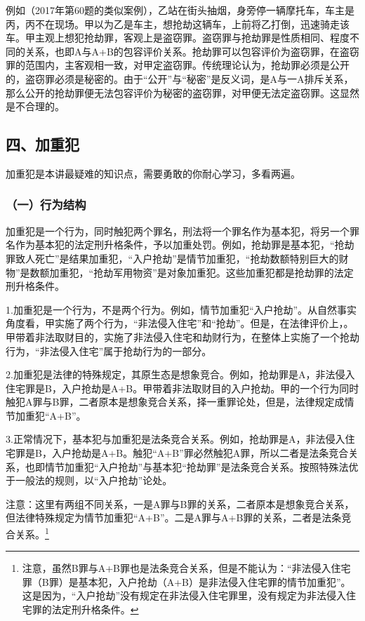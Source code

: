 例如（2017年第60题的类似案例），乙站在街头抽烟，身旁停一辆摩托车，车主是丙，丙不在现场。甲以为乙是车主，想抢劫这辆车，上前将乙打倒，迅速骑走该车。甲主观上想犯抢劫罪，客观上是盗窃罪。盗窃罪与抢劫罪是性质相同、程度不同的关系，也即A与A+B的包容评价关系。抢劫罪可以包容评价为盗窃罪，在盗窃罪的范围内，主客观相一致，对甲定盗窃罪。传统理论认为，抢劫罪必须是公开的，盗窃罪必须是秘密的。由于“公开”与“秘密”是反义词，是A与一A排斥关系，那么公开的抢劫罪便无法包容评价为秘密的盗窃罪，对甲便无法定盗窃罪。这显然是不合理的。

\subsection*{四、加重犯}

加重犯是本讲最疑难的知识点，需要勇敢的你耐心学习，多看两遍。

\subsubsection*{（一）行为结构}

加重犯是一个行为，同时触犯两个罪名，刑法将一个罪名作为基本犯，将另一个罪名作为基本犯的法定刑升格条件，予以加重处罚。例如，抢劫罪是基本犯，“抢劫罪致人死亡”是结果加重犯，“入户抢劫”是情节加重犯，“抢劫数额特别巨大的财物”是数额加重犯，“抢劫军用物资”是对象加重犯。这些加重犯都是抢劫罪的法定刑升格条件。

1.加重犯是一个行为，不是两个行为。例如，情节加重犯“入户抢劫”。从自然事实角度看，甲实施了两个行为，“非法侵入住宅”和“抢劫”。但是，在法律评价上，。甲带着非法取财目的，实施了非法侵入住宅和劫财行为，在整体上实施了一个抢劫行为，“非法侵入住宅”属于抢劫行为的一部分。

2.加重犯是法律的特殊规定，其原生态是想象竞合。例如，抢劫罪是A，非法侵入住宅罪是B，入户抢劫是A+B。甲带着非法取财目的入户抢劫。甲的一个行为同时触犯A罪与B罪，二者原本是想象竞合关系，择一重罪论处，但是，法律规定成情节加重犯“A+B”。

3.正常情况下，基本犯与加重犯是法条竞合关系。例如，抢劫罪是A，非法侵入住宅罪是B，入户抢劫是A+B。触犯“A+B”罪必然触犯A罪，所以二者是法条竞合关系，也即情节加重犯“入户抢劫”与基本犯“抢劫罪”是法条竞合关系。按照特殊法优于一般法的规则，以“入户抢劫”论处。

注意：这里有两组不同关系，一是A罪与B罪的关系，二者原本是想象竞合关系，但法律特殊规定为情节加重犯“A+B”。二是A罪与A+B罪的关系，二者是法条竞合关系。\footnote{注意，虽然B罪与A+B罪也是法条竞合关系，但是不能认为：“非法侵入住宅罪（B罪）是基本犯，入户抢劫（A+B）是非法侵入住宅罪的情节加重犯”。这是因为，“入户抢劫”没有规定在非法侵入住宅罪里，没有规定为非法侵入住宅罪的法定刑升格条件。}

